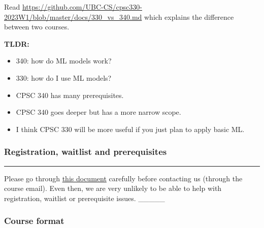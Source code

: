 \documentclass[11pt]{article}
\providecommand{\tightlist}{%
      \setlength{\itemsep}{0pt}\setlength{\parskip}{0pt}}
\begin{document}
Read
\url{https://github.com/UBC-CS/cpsc330-2023W1/blob/master/docs/330_vs_340.md}
which explains the difference between two courses.

\textbf{TLDR:}

\begin{itemize}
\tightlist
\item
  340: how do ML models work?
\item
  330: how do I use ML models?
\item
  CPSC 340 has many prerequisites.
\item
  CPSC 340 goes deeper but has a more narrow scope.
\item
  I think CPSC 330 will be more useful if you just plan to apply basic
  ML.
\end{itemize}

    \subsubsection{Registration, waitlist and
prerequisites}\label{registration-waitlist-and-prerequisites}

    \begin{center}\rule{0.5\linewidth}{0.5pt}\end{center}

Please go through
\href{https://github.com/UBC-CS/cpsc330-2023W2/blob/main/syllabus.md\#Registration}{this
document} carefully before contacting us (through the course email).
Even then, we are very unlikely to be able to help with registration,
waitlist or prerequisite issues. \_\_\_\_\_

    \subsubsection{Course format}\label{course-format}
\end{document}

